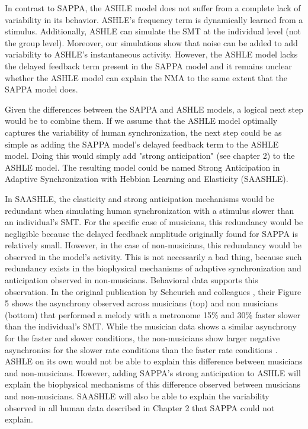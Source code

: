 \documentclass{report}
\begin{document}
In contrast to SAPPA, the ASHLE model does not suffer from a complete lack of variability in its behavior. ASHLE's frequency term is dynamically learned from a stimulus. Additionally, ASHLE can simulate the SMT at the individual level (not the group level). Moreover, our simulations show that noise can be added to add variability to ASHLE's instantaneous activity. However, the ASHLE model lacks the delayed feedback term present in the SAPPA model and it remains unclear whether the ASHLE model can explain the NMA to the same extent that the SAPPA model does. 

Given the differences between the SAPPA and ASHLE models, a logical next step would be to combine them. If we assume that the ASHLE model optimally captures the variability of human synchronization, the next step could be as simple as adding the SAPPA model's delayed feedback term to the ASHLE model. Doing this would simply add "strong anticipation" (see chapter 2) to the ASHLE model. The resulting model could be named Strong Anticipation in Adaptive Synchronization with Hebbian Learning and Elasticity (SAASHLE). 

In SAASHLE, the elasticity and strong anticipation mechanisms would be redundant when simulating human synchronization with a stimulus slower than an individual's SMT. For the specific case of musicians, this redundancy would be negligible because the delayed feedback amplitude originally found for SAPPA is relatively small. However, in the case of non-musicians, this redundancy would be observed in the model's activity. This is not necessarily a bad thing, because such redundancy exists in the biophysical mechanisms of adaptive synchronization and anticipation observed in non-musicians. Behavioral data supports this observation. In the original publication by Scheurich and colleagues \cite{scheurich2018tapping}, their Figure 5 shows the asynchrony observed across musicians (top) and non musicians (bottom) that performed a melody with a metronome 15\% and 30\% faster slower than the individual’s SMT. While the musician data shows a similar asynchrony for the faster and slower conditions, the non-musicians show larger negative asynchronies for the slower rate conditions than the faster rate conditions \cite{scheurich2018tapping}. ASHLE on its own would not be able to explain this difference between musicians and non-musicians. However, adding SAPPA's strong anticipation to ASHLE will explain the biophysical mechanisms of this difference observed between musicians and non-musicians. SAASHLE will also be able to explain the variability observed in all human data described in Chapter 2 that SAPPA could not explain. 
\end{document}
